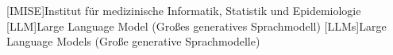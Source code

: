 \begin{acronym}[SPARQL]
[IMISE]{Institut für medizinische Informatik, Statistik und Epidemiologie}
[LLM]{Large Language Model (Großes generatives Sprachmodell)}
[LLMs]{Large Language Models (Große generative Sprachmodelle)}
\end{acronym}
